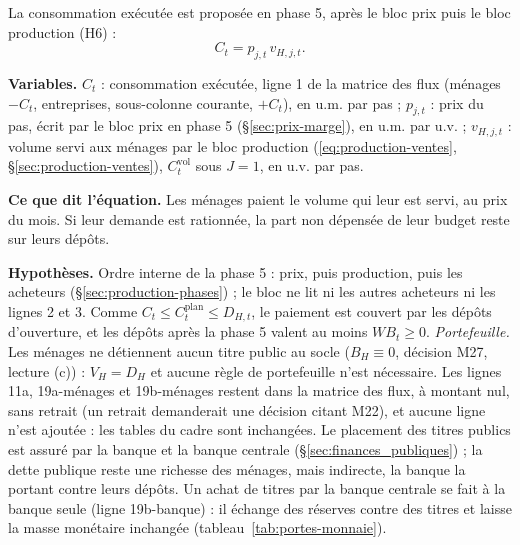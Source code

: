 \documentclass[11pt,a4paper]{article}
\newcommand{\variables}{\par\noindent\textbf{Variables.} }
\newcommand{\sens}{\par\noindent\textbf{Ce que dit l'équation.} }
\newcommand{\hyp}{\par\noindent\textbf{Hypothèses.} }
\begin{document}
\begin{proposee}
La consommation exécutée est proposée en phase 5, après le bloc prix puis le bloc production (H6) :
\begin{equation*}
C_t = p_{j,t}\, v_{H,j,t} . \tag{H6}
\end{equation*}

\variables $C_t$ : consommation exécutée, ligne 1 de la matrice des flux (ménages $-C_t$, entreprises, sous-colonne courante, $+C_t$), en u.m. par pas ; $p_{j,t}$ : prix du pas, écrit par le bloc prix en phase 5 (\S\ref{sec:prix-marge}), en u.m. par u.v. ; $v_{H,j,t}$ : volume servi aux ménages par le bloc production (\eqref{eq:production-ventes}, \S\ref{sec:production-ventes}), $C^{\mathrm{vol}}_t$ sous $J = 1$, en u.v. par pas.
\sens Les ménages paient le volume qui leur est servi, au prix du mois. Si leur demande est rationnée, la part non dépensée de leur budget reste sur leurs dépôts.
\hyp Ordre interne de la phase 5 : prix, puis production, puis les acheteurs (\S\ref{sec:production-phases}) ; le bloc ne lit ni les autres acheteurs ni les lignes 2 et 3. Comme $C_t \le C^{\mathrm{plan}}_t \le D_{H,t}$, le paiement est couvert par les dépôts d'ouverture, et les dépôts après la phase 5 valent au moins $\mathit{WB}_t \ge 0$. \emph{Portefeuille.} Les ménages ne détiennent aucun titre public au socle ($B_H \equiv 0$, décision M27, lecture (c)) : $V_H = D_H$ et aucune règle de portefeuille n'est nécessaire. Les lignes 11a, 19a-ménages et 19b-ménages restent dans la matrice des flux, à montant nul, sans retrait (un retrait demanderait une décision citant M22), et aucune ligne n'est ajoutée : les tables du cadre sont inchangées. Le placement des titres publics est assuré par la banque et la banque centrale (\S\ref{sec:finances_publiques}) ; la dette publique reste une richesse des ménages, mais indirecte, la banque la portant contre leurs dépôts. Un achat de titres par la banque centrale se fait à la banque seule (ligne 19b-banque) : il échange des réserves contre des titres et laisse la masse monétaire inchangée (tableau~\ref{tab:portes-monnaie}).

\end{proposee}
\end{document}
